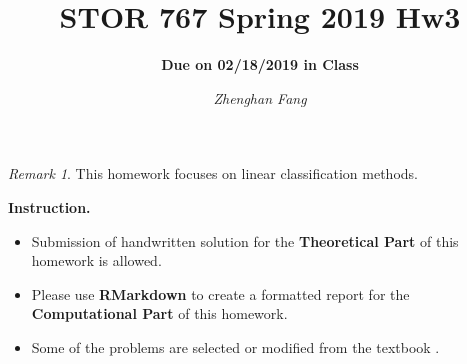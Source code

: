 \documentclass[10pt]{article}
\title{STOR 767 Spring 2019 Hw3}
\subtitle{\textbf{Due on 02/18/2019 in Class}}
\author{\it Zhenghan Fang}
\date{}
\theoremstyle{definition}
\theoremstyle{remark}
\newtheorem*{rmk}{Remark}
\begin{document}
	\maketitle
	

\begin{rmk}
	This homework focuses on linear classification methods. 
\end{rmk}

\noindent \textbf{Instruction.}
\begin{itemize}
	\item Submission of handwritten solution for the \textbf{Theoretical Part} of this homework is allowed.
	
	\item Please use \textbf{RMarkdown} to create a formatted report for the \textbf{Computational Part} of this homework. 

	\item Some of the problems are selected or modified from the textbook \cite{friedman2009elements}.
\end{itemize}
\end{document}

